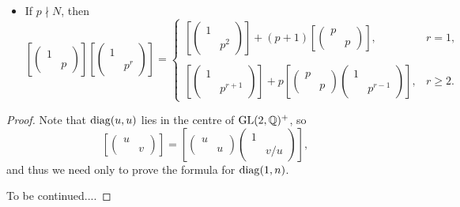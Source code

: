 \begin{proposition}
\begin{itemize}
        \item If $p\nmid N$, then
        \[\left[ \begin{pmatrix}
            1&\\ & p
        \end{pmatrix} \right]\left[ \begin{pmatrix}
            1&\\ & p^r
        \end{pmatrix} \right] = \begin{cases}
            \left[ \begin{pmatrix}
            1&\\ & p^{2}
        \end{pmatrix} \right] + (p+1)\left[ \begin{pmatrix}
            p&\\ & p
        \end{pmatrix} \right], & r = 1,\\
        & \\
        \left[ \begin{pmatrix}
            1&\\ & p^{r + 1}
        \end{pmatrix} \right]+ p\left[ \begin{pmatrix}
            p&\\ & p
        \end{pmatrix}\begin{pmatrix}
            1 &\\ & p^{r-1}
        \end{pmatrix} \right], & r\ge 2.
        \end{cases} \]
    \end{itemize}
\end{proposition}
\begin{proof}
    Note that $\operatorname{diag}(u, u)$ lies in the centre of $\operatorname{GL}(2, \mathbb{Q})^+$, so \[\left[ \begin{pmatrix}
        u &\\ & v
    \end{pmatrix} \right] = \left[ \begin{pmatrix}
        u & \\ & u
    \end{pmatrix}\begin{pmatrix}
        1 & \\ & v/u
    \end{pmatrix} \right],\]
    and thus we need only to prove the formula for $\operatorname{diag}(1, n)$.

    To be continued....
\end{proof}


